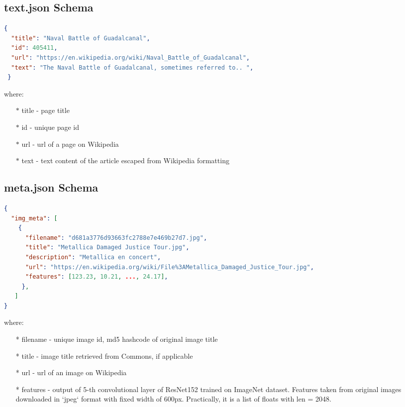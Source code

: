 \subsection{text.json Schema}
\begin{lstlisting}[language=json,firstnumber=1]
{
  "title": "Naval Battle of Guadalcanal",
  "id": 405411,
  "url": "https://en.wikipedia.org/wiki/Naval_Battle_of_Guadalcanal",
  "text": "The Naval Battle of Guadalcanal, sometimes referred to.. ",
 }
\end{lstlisting}

where:

\begin{itemize}
    \item[$\ast$] title - page title
    \item[$\ast$] id - unique page id
    \item[$\ast$] url - url of a page on Wikipedia
    \item[$\ast$] text - text content of the article escaped from Wikipedia formatting
\end{itemize}

\subsection{meta.json Schema}

\begin{lstlisting}[language=json,firstnumber=1]
{
  "img_meta": [
    {
      "filename": "d681a3776d93663fc2788e7e469b27d7.jpg",
      "title": "Metallica Damaged Justice Tour.jpg",
      "description": "Metallica en concert",
      "url": "https://en.wikipedia.org/wiki/File%3AMetallica_Damaged_Justice_Tour.jpg",
      "features": [123.23, 10.21, ..., 24.17],
     },
   ]
}
\end{lstlisting}

where:
\begin{itemize}
    \item[*] filename - unique image id, md5 hashcode of original image title
    \item[*] title - image title retrieved from Commons, if applicable
    \item[*] url - url of an image on Wikipedia
    \item[*] features - output of 5-th convolutional layer of ResNet152 trained on ImageNet dataset. Features taken from original images downloaded in `jpeg` format with fixed width of 600px. Practically, it is a list of floats with len = 2048.
\end{itemize}

